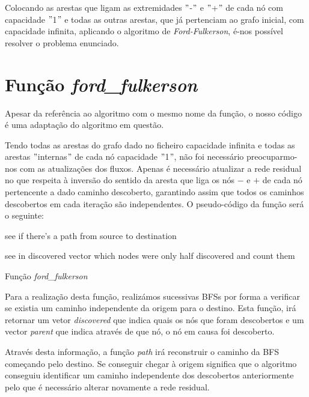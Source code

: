 \documentclass[a4paper]{article}
\begin{document}
Colocando as arestas que ligam as extremidades $"$-$"$ e $"$+$"$  de cada nó com capacidade $"$1$"$ e todas as outras arestas, que já pertenciam ao grafo inicial, com capacidade infinita, aplicando o algoritmo de \textit{Ford-Fulkerson}, é-nos possível resolver o problema enunciado.


\section{Função \textit{ford\_fulkerson}}
Apesar da referência ao algoritmo com o mesmo nome da função, o nosso código é uma adaptação do algoritmo em questão.

Tendo todas as arestas do grafo dado no ficheiro capacidade infinita e todas as arestas $"$internas$"$ de cada nó capacidade $"$1$"$, não foi necessário preocuparmo-nos com as atualizações dos fluxos. Apenas é necessário atualizar a rede residual no que respeita à inversão do sentido da aresta que liga os nós $-$ e $+$ de cada nó pertencente a dado caminho descoberto, garantindo assim que todos os caminhos descobertos em cada iteração são independentes.
\vskip 5mm
O pseudo-código da função será o seguinte:
\vskip 2mm
\begin{algorithm}[H]
 	\vskip 1mm
	see if there's a path from source to destination\;
	
	
	see in discovered vector which nodes were only half discovered and count them\;
	
 \caption{Função \textit{ford\_fulkerson}}
\end{algorithm}
\vskip 5mm
Para a realização desta função, realizámos sucessivas BFSs por forma a verificar se existia um caminho independente da origem para o destino. Esta função, irá retornar um vetor \textit{discovered} que indica quais os nós que foram descobertos e um vector \textit{parent} que indica através de que nó, o nó em causa foi descoberto.

Através desta informação, a função \textit{path} irá reconstruir o caminho da BFS começando pelo destino. Se conseguir chegar à origem significa que o algoritmo conseguiu identificar um caminho independente dos descobertos anteriormente pelo que é necessário alterar novamente a rede residual.
\end{document}
